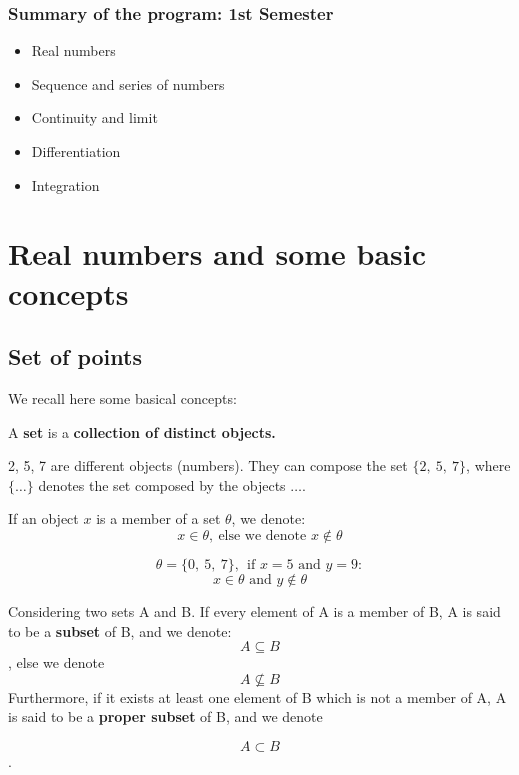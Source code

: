 \documentclass[12pt, a4paper]{book}
\begin{document}
\subsection*{Summary of the program: 1st Semester}
\begin{itemize}
  \item Real numbers
  \item Sequence and series of numbers
  \item Continuity and limit
  \item Differentiation
  \item Integration
\end{itemize}

\chapter{Real numbers and some basic concepts}

\section{Set of points}
We recall here some basical concepts:
\begin{defn}
  A \textbf{set} is a \textbf{collection of distinct objects.}
\end{defn}
\begin{exmp}
  2, 5, 7 are different objects (numbers). They can compose the set $\{2, \ 5, \ 7 \}$, where $\{ \ldots \}$ denotes the
  set composed by the objects $\ldots$.
\end{exmp}

\begin{note}
  If an object $x$ is a member of a set $\theta$, we denote: 
  $$ x \in \theta, \ \text{else we denote } x \notin \theta$$

  \begin{exmp}
    \[
      \theta = \{0, \ 5, \ 7 \}, \ \ \text{if }x=5 \text{ and } y=9:
    \]
    \[
      x \in \theta \text{ and } y \notin \theta
    \]
  \end{exmp}
\end{note}

\begin{defn}
  Considering two sets A and B. If every element of A is a member of B, A is said to be a \textbf{subset} of B, and we denote:
  \boldmath $$ A \subseteq B$$, else we denote 
  $$ A \nsubseteq B $$ 
  Furthermore, if it exists at least one element of B which is not a member of A, A is said to be a \textbf{proper subset} of B, and we denote

  $$ A \subset B $$. \unboldmath
  
\end{defn}
\end{document}
